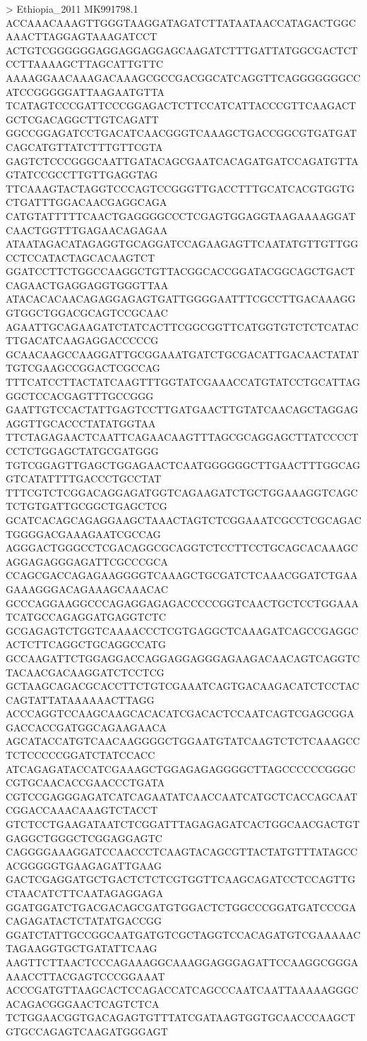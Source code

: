> Ethiopia_2011 MK991798.1 
ACCAAACAAAGTTGGGTAAGGATAGATCTTATAATAACCATAGACTGGCAAACTTAGGAGTAAAGATCCT
ACTGTCGGGGGGAGGAGGAGGAGCAAGATCTTTGATTATGGCGACTCTCCTTAAAAGCTTAGCATTGTTC
AAAAGGAACAAAGACAAAGCGCCGACGGCATCAGGTTCAGGGGGGGCCATCCGGGGGATTAAGAATGTTA
TCATAGTCCCGATTCCCGGAGACTCTTCCATCATTACCCGTTCAAGACTGCTCGACAGGCTTGTCAGATT
GGCCGGAGATCCTGACATCAACGGGTCAAAGCTGACCGGCGTGATGATCAGCATGTTATCTTTGTTCGTA
GAGTCTCCCGGGCAATTGATACAGCGAATCACAGATGATCCAGATGTTAGTATCCGCCTTGTTGAGGTAG
TTCAAAGTACTAGGTCCCAGTCCGGGTTGACCTTTGCATCACGTGGTGCTGATTTGGACAACGAGGCAGA
CATGTATTTTTCAACTGAGGGGCCCTCGAGTGGAGGTAAGAAAAGGATCAACTGGTTTGAGAACAGAGAA
ATAATAGACATAGAGGTGCAGGATCCAGAAGAGTTCAATATGTTGTTGGCCTCCATACTAGCACAAGTCT
GGATCCTTCTGGCCAAGGCTGTTACGGCACCGGATACGGCAGCTGACTCAGAACTGAGGAGGTGGGTTAA
ATACACACAACAGAGGAGAGTGATTGGGGAATTTCGCCTTGACAAAGGGTGGCTGGACGCAGTCCGCAAC
AGAATTGCAGAAGATCTATCACTTCGGCGGTTCATGGTGTCTCTCATACTTGACATCAAGAGGACCCCCG
GCAACAAGCCAAGGATTGCGGAAATGATCTGCGACATTGACAACTATATTGTCGAAGCCGGACTCGCCAG
TTTCATCCTTACTATCAAGTTTGGTATCGAAACCATGTATCCTGCATTAGGGCTCCACGAGTTTGCCGGG
GAATTGTCCACTATTGAGTCCTTGATGAACTTGTATCAACAGCTAGGAGAGGTTGCACCCTATATGGTAA
TTCTAGAGAACTCAATTCAGAACAAGTTTAGCGCAGGAGCTTATCCCCTCCTCTGGAGCTATGCGATGGG
TGTCGGAGTTGAGCTGGAGAACTCAATGGGGGGCTTGAACTTTGGCAGGTCATATTTTGACCCTGCCTAT
TTTCGTCTCGGACAGGAGATGGTCAGAAGATCTGCTGGAAAGGTCAGCTCTGTGATTGCGGCTGAGCTCG
GCATCACAGCAGAGGAAGCTAAACTAGTCTCGGAAATCGCCTCGCAGACTGGGGACGAAAGAATCGCCAG
AGGGACTGGGCCTCGACAGGCGCAGGTCTCCTTCCTGCAGCACAAAGCAGGAGAGGGAGATTCGCCCGCA
CCAGCGACCAGAGAAGGGGTCAAAGCTGCGATCTCAAACGGATCTGAAGAAAGGGACAGAAAGCAAACAC
GCCCAGGAAGGCCCAGAGGAGAGACCCCCGGTCAACTGCTCCTGGAAATCATGCCAGAGGATGAGGTCTC
GCGAGAGTCTGGTCAAAACCCTCGTGAGGCTCAAAGATCAGCCGAGGCACTCTTCAGGCTGCAGGCCATG
GCCAAGATTCTGGAGGACCAGGAGGAGGGAGAAGACAACAGTCAGGTCTACAACGACAAGGATCTCCTCG
GCTAAGCAGACGCACCTTCTGTCGAAATCAGTGACAAGACATCTCCTACCAGTATTATAAAAAACTTAGG
ACCCAGGTCCAAGCAAGCACACATCGACACTCCAATCAGTCGAGCGGAGACCACCGATGGCAGAAGAACA
AGCATACCATGTCAACAAGGGGCTGGAATGTATCAAGTCTCTCAAAGCCTCTCCCCCGGATCTATCCACC
ATCAGAGATACCATCGAAAGCTGGAGAGAGGGGCTTAGCCCCCCGGGCCGTGCAACACCGAACCCTGATA
CGTCCGAGGGAGATCATCAGAATATCAACCAATCATGCTCACCAGCAATCGGACCAAACAAAGTCTACCT
GTCTCCTGAAGATAATCTCGGATTTAGAGAGATCACTGGCAACGACTGTGAGGCTGGGCTCGGAGGAGTC
CAGGGGAAAGGATCCAACCCTCAAGTACAGCGTTACTATGTTTATAGCCACGGGGGTGAAGAGATTGAAG
GACTCGAGGATGCTGACTCTCTCGTGGTTCAAGCAGATCCTCCAGTTGCTAACATCTTCAATAGAGGAGA
GGATGGATCTGACGACAGCGATGTGGACTCTGGCCCGGATGATCCCGACAGAGATACTCTATATGACCGG
GGATCTATTGCCGGCAATGATGTCGCTAGGTCCACAGATGTCGAAAAACTAGAAGGTGCTGATATTCAAG
AAGTTCTTAACTCCCAGAAAGGCAAAGGAGGGAGATTCCAAGGCGGGAAAACCTTACGAGTCCCGGAAAT
ACCCGATGTTAAGCACTCCAGACCATCAGCCCAATCAATTAAAAAGGGCACAGACGGGAACTCAGTCTCA
TCTGGAACGGTGACAGAGTGTTTATCGATAAGTGGTGCAACCCAAGCTGTGCCAGAGTCAAGATGGGAGT
